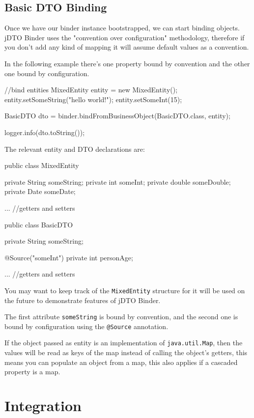 \documentclass[11pt]{article}
\newcommand{\JDTO}{jDTO Binder\xspace}
\begin{document}
\subsection{Basic DTO Binding}


Once we have our binder instance bootstrapped, we can start binding objects. \JDTO uses the "convention over configuration"
methodology, therefore if you don't add any kind of mapping it will assume default values as a convention. 


In the following example there's one property bound by convention and the other one bound by configuration.


\begin{java}
//bind entities
MixedEntity entity = new MixedEntity();
entity.setSomeString("hello world!");
entity.setSomeInt(15);
        
BasicDTO dto = binder.bindFromBusinessObject(BasicDTO.class, entity);
        
logger.info(dto.toString());
\end{java}

The relevant entity and DTO declarations are:


\begin{java}
 public class MixedEntity {
    private String someString;
    private int someInt;
    private double someDouble;
    private Date someDate;
    
    ... //getters and setters
}

public class BasicDTO {
    private String someString;
    
    @Source("someInt")
    private int personAge;
    
    ... //getters and setters
}
\end{java}

You may want to keep track of the \texttt{MixedEntity} structure for it will be used on the future
to demonstrate features of \JDTO.

The first attribute \texttt{someString} is bound by convention, and the second one is bound
by configuration using the \texttt{@Source} annotation.

If the object passed as entity is an implementation of \texttt{java.util.Map}, then the values will be read as keys of the map instead of calling the object's getters, this means you can populate an object from a map, this also applies if a cascaded property is a map. 

\section{Integration}
\end{document}
